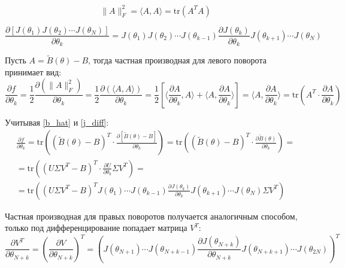\begin{note}
\begin{equation}
    \|A\|_F^2 = \langle A, A\rangle = \text{tr}\left(A^TA\right)
\end{equation}
\end{note}
\begin{note}
\begin{equation} \label{j_diff}
    \frac{\partial [J(\theta_1) J(\theta_2) \cdots J(\theta_N)]}{\partial \theta_k} =
    J(\theta_1) J(\theta_2) \cdots  J(\theta_{k-1})\frac{\partial J(\theta_k)}{\partial \theta_k}J(\theta_{k+1}) \cdots J(\theta_N)
\end{equation}
\end{note}

Пусть $A = \tilde{B}(\theta) - B$, тогда частная производная для левого поворота принимает вид:
\begin{equation*}
    \frac{\partial f}{\partial \theta_k} =
    \frac{1}{2}\frac{\partial (\|A\|_F^2)}{\partial \theta_k} =
    \frac{1}{2}\frac{\partial (\langle A, A\rangle)}{\partial \theta_k} =
    \frac{1}{2} \left[ \langle\frac{\partial A}{\partial \theta_k}, A\rangle + \langle A, \frac{\partial A}{\partial \theta_k}\rangle \right]= \langle A, \frac{\partial A}{\partial \theta_k}\rangle = \text{tr}(A^T\cdot\frac{\partial A}{\partial \theta_k})
\end{equation*}

Учитывая \eqref{b_hat} и \eqref{j_diff}:
\begin{equation}
\begin{split}
    \frac{\partial f}{\partial \theta_k} = 
    \text{tr}\left((\tilde{B}(\theta) - B)^T\cdot\frac{\partial [\tilde{B}(\theta) - B]}{\partial \theta_k}\right)=
    \text{tr}\left((\tilde{B}(\theta) - B)^T\cdot\frac{\partial \tilde{B}(\theta)}{\partial \theta_k}\right)
    =\\[6pt] =
    \text{tr}\left((U\Sigma V^T - B)^T\cdot\frac{\partial U}{\partial \theta_k}\Sigma V^T\right) 
    =\\[6pt] =
    \text{tr}\left((U\Sigma V^T - B)^TJ(\theta_1) \cdots  J(\theta_{k-1})\frac{\partial J(\theta_k)}{\partial \theta_k}J(\theta_{k+1}) \cdots J(\theta_N)\Sigma V^T\right)
\end{split}
\end{equation}

\begin{note}
Частная производная для правых поворотов получается аналогичным способом, только под дифференцирование попадает матрица $V^T$:
\begin{equation*}
    \frac{\partial V^T}{\partial \theta_{N+k}} = \left(\frac{\partial V}{\partial \theta_{N+k}}\right)^T = \left(J(\theta_{N+1}) \cdots  J(\theta_{N+k-1})\frac{\partial J(\theta_{N+k})}{\partial \theta_{N+k}}J(\theta_{N+k+1}) \cdots J(\theta_{2N})\right)^T
\end{equation*}
\end{note}

